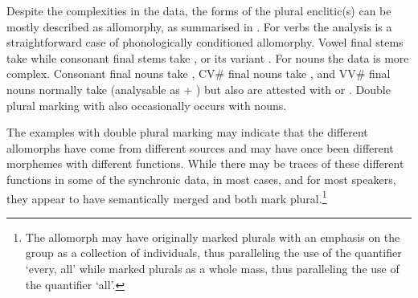 \begin{exe}
	\label{ex:130914-2, 1.17}
	\label{ex:BigBook}
	\label{ex:130902-1, 3.28}
\end{exe}

Despite the complexities in the data,
the forms of the plural enclitic(s) can
be mostly described as allomorphy,
as summarised in .
For verbs the analysis is a straightforward case
of phonologically conditioned allomorphy.
Vowel final stems take  while consonant
final stems take , or its variant .
For nouns the data is more complex.
Consonant final nouns take ,
CV{\#} final nouns take ,
and VV{\#} final nouns normally take
 (analysable as  + )
but also are attested with  or .
Double plural marking with  also occasionally
occurs with nouns.

The examples with double plural marking may
indicate that the different allomorphs have come from different sources
and may have once been different morphemes with different functions.
While there may be traces of these different functions
in some of the synchronic data, in most cases, and for most speakers,
they appear to have semantically merged and both mark plural.\footnote{
		The allomorph  may have originally marked plurals with
		an emphasis on the group as a collection of individuals,
		thus paralleling the use of the quantifier  `every, all'
		while  marked plurals as a whole mass,
		thus paralleling the use of the quantifier  `all'.}

